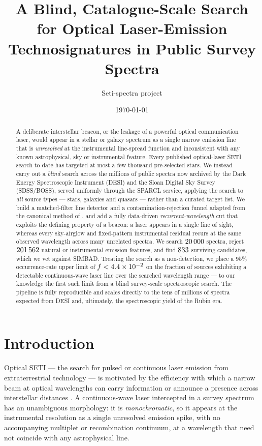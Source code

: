 \documentclass[11pt]{article}
\title{A Blind, Catalogue-Scale Search for Optical Laser-Emission
Technosignatures in Public Survey Spectra}
\author{Seti-spectra project}
\date{\today}
\begin{document}
\maketitle

\begin{abstract}
A deliberate interstellar beacon, or the leakage of a powerful optical
communication laser, would appear in a stellar or galaxy spectrum as a single
narrow emission line that is \emph{unresolved} at the instrumental line-spread
function and inconsistent with any known astrophysical, sky or instrumental
feature. Every published optical-laser SETI search to date has targeted at most a
few thousand pre-selected stars. We instead carry out a \emph{blind} search across
the millions of public spectra now archived by the Dark Energy Spectroscopic
Instrument (DESI) and the Sloan Digital Sky Survey (SDSS/BOSS), served uniformly
through the SPARCL service, applying the search to \emph{all} source types ---
stars, galaxies and quasars --- rather than a curated target list. We build a
matched-filter line detector and a contamination-rejection funnel adapted from the
canonical method of \citet{Tellis2017}, and add a fully data-driven
\emph{recurrent-wavelength} cut that exploits the defining property of a beacon: a
laser appears in a single line of sight, whereas every sky-airglow and
fixed-pattern instrumental residual recurs at the same observed wavelength across
many unrelated spectra. We search $20\,000$ spectra, reject
$201\,562$ natural or instrumental emission features, and find
$833$ surviving candidates, which we vet against SIMBAD. Treating the
search as a non-detection, we place a $95\%$ occurrence-rate upper limit of
$f < 4.4\times10^{-2}$ on the fraction of sources exhibiting a detectable
continuous-wave laser line over the searched wavelength range --- to our knowledge
the first such limit from a blind survey-scale spectroscopic search. The pipeline
is fully reproducible and scales directly to the tens of millions of spectra
expected from DESI and, ultimately, the spectroscopic yield of the Rubin era.
\end{abstract}

\section{Introduction}
Optical SETI --- the search for pulsed or continuous laser emission from
extraterrestrial technology --- is motivated by the efficiency with which a narrow
beam at optical wavelengths can carry information or announce a presence across
interstellar distances \citep{Schwartz1961,Howard2004}. A continuous-wave laser
intercepted in a survey spectrum has an unambiguous morphology: it is
\emph{monochromatic}, so it appears at the instrumental resolution as a single
unresolved emission spike, with no accompanying multiplet or recombination
continuum, at a wavelength that need not coincide with any astrophysical line.
\end{document}
